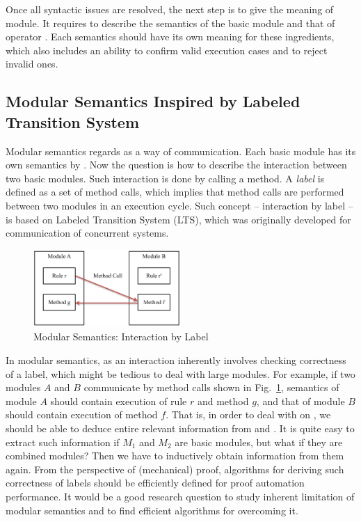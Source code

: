 Once all syntactic issues are resolved, the next step is to give the
meaning of module. It requires to describe the semantics of the basic
module  and that of \ModP{} operator
\Sem{\ModP{}}. Each semantics should have its own meaning for these
ingredients, which also includes an ability to confirm valid execution
cases and to reject invalid ones.

\subsection{Modular Semantics Inspired by Labeled Transition System}
\label{sec:mod}

Modular semantics regards \Sem{\ModP{}} as a way of
communication. Each basic module has its own semantics by
. Now the question is how to describe
the interaction between two basic modules. Such interaction is done by
calling a method. A \emph{label} is defined as a set of method calls,
which implies that method calls are performed between two modules in
an execution cycle. Such concept -- interaction by label -- is based
on Labeled Transition System (LTS), which was originally developed for
communication of concurrent systems.
\begin{figure}[h]
  \centering
  \includegraphics[width=0.5\textwidth]{figures/modular-sem.pdf}
  \caption{Modular Semantics: Interaction by Label}
  \label{fig:mod}
\end{figure}

In modular semantics, \Sem{\ModP{}} as an interaction inherently
involves checking correctness of a label, which might be tedious to
deal with large modules. For example, if two modules $A$ and $B$
communicate by method calls shown in Fig.~\ref{fig:mod}, semantics of
module $A$ should contain execution of rule $r$ and method $g$, and
that of module $B$ should contain execution of method $f$. That is, in
order to deal with \Sem{\ModP{}} on , we should
be able to deduce entire relevant information from  and
. It is quite easy to extract such information if $M_1$ and
$M_2$ are basic modules, but what if they are combined modules? Then
we have to inductively obtain information from them again. From the
perspective of (mechanical) proof, algorithms for deriving such
correctness of labels should be efficiently defined for proof
automation performance. It would be a good research question to study
inherent limitation of modular semantics and to find efficient
algorithms for overcoming it.

